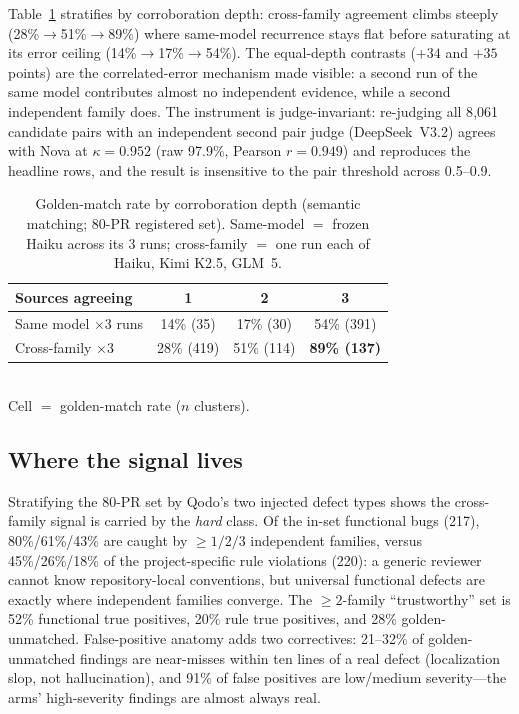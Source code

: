 \documentclass[conference]{IEEEtran}
\begin{document}
Table~\ref{tab:depth} stratifies by corroboration depth: cross-family
agreement climbs steeply (28\%${\to}$51\%${\to}$89\%) where same-model
recurrence stays flat before saturating at its error ceiling
(14\%${\to}$17\%${\to}$54\%). The equal-depth contrasts (${+}34$ and
${+}35$ points) are the correlated-error mechanism made visible: a second
run of the same model contributes almost no independent evidence, while a
second independent family does. The instrument is judge-invariant:
re-judging all 8{,}061 candidate pairs with an independent second pair
judge (DeepSeek~V3.2) agrees with Nova at $\kappa{=}0.952$ (raw 97.9\%,
Pearson $r{=}0.949$) and reproduces the headline rows, and the result is
insensitive to the pair threshold across 0.5--0.9.

\begin{table}[t]
\caption{Golden-match rate by corroboration depth (semantic matching;
80-PR registered set). Same-model $=$ frozen Haiku across its 3 runs;
cross-family $=$ one run each of Haiku, Kimi K2.5, GLM~5.}
\label{tab:depth}
\centering
\begin{tabular}{lccc}
\toprule
Sources agreeing & 1 & 2 & 3 \\
\midrule
Same model $\times$3 runs & 14\% (35) & 17\% (30) & 54\% (391) \\
Cross-family $\times$3    & 28\% (419) & 51\% (114) & \textbf{89\% (137)} \\
\bottomrule
\end{tabular}
\\[2pt]{\footnotesize Cell $=$ golden-match rate ($n$ clusters).}
\end{table}

\subsection{Where the signal lives}
Stratifying the 80-PR set by Qodo's two injected defect types shows the
cross-family signal is carried by the \emph{hard} class. Of the in-set
functional bugs (217), 80\%/61\%/43\% are caught by ${\geq}1/2/3$
independent families, versus 45\%/26\%/18\% of the project-specific rule
violations (220): a generic reviewer cannot know repository-local
conventions, but universal functional defects are exactly where
independent families converge. The ${\geq}2$-family ``trustworthy'' set is
52\% functional true positives, 20\% rule true positives, and 28\%
golden-unmatched. False-positive anatomy adds two correctives: 21--32\% of
golden-unmatched findings are near-misses within ten lines of a real
defect (localization slop, not hallucination), and 91\% of false positives
are low/medium severity---the arms' high-severity findings are almost
always real.
\end{document}

